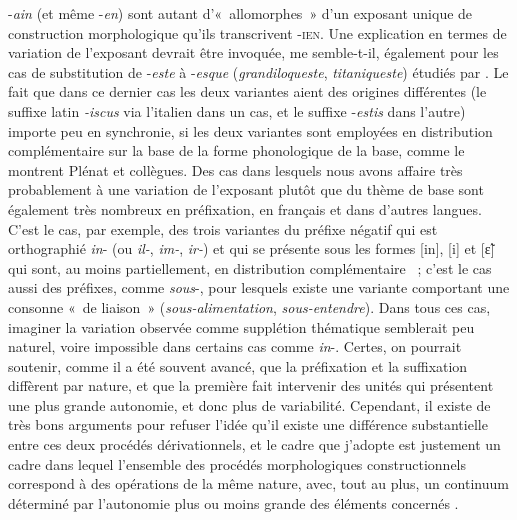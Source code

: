 \documentclass[output=paper]{langsci/langscibook}
\begin{document}
-\emph{ain} (et même -\emph{en}) sont autant d'«~allomorphes~» d'un
exposant unique de construction morphologique qu'ils transcrivent
-\textsc{ien}. Une explication en termes de variation de l'exposant
devrait être invoquée, me semble-t-il, également pour les cas de
substitution de -\emph{este} à -\emph{esque} (\emph{grandiloqueste},
\emph{titaniqueste}) étudiés par %
\citet{plenat2002.pichon}%
%
%
. Le fait
que dans ce dernier cas les deux variantes aient des origines
différentes (le suffixe latin \mbox{\emph{-iscus}} via l'italien dans un cas,
et le suffixe -\emph{estis} dans l'autre) importe peu en synchronie, si
les deux variantes sont employées en distribution complémentaire sur la
base de la forme phonologique de la base, comme le montrent Plénat et
collègues. Des cas dans lesquels nous avons affaire très probablement à
une variation de l'exposant plutôt que du thème de base sont également
très nombreux en préfixation, en français et dans d'autres langues.
C'est le cas, par exemple, des trois variantes du préfixe négatif qui
est orthographié \emph{in}- (ou \emph{il-}, \emph{im-}, \emph{ir-}) et
qui se présente sous les formes {[}in{]}, {[}i{]} et {[}ɛ̃{]} qui sont,
au moins partiellement, en distribution complémentaire %
\citep[cf.][]{Apotheloz2003}%
%
%
~; c'est le cas aussi des préfixes, comme \emph{sous}-, pour
lesquels existe une variante comportant une consonne «~de liaison~»
(\emph{sous-alimentation}, \emph{sous-entendre}). Dans tous ces cas,
imaginer la variation observée comme supplétion thématique semblerait
peu naturel, voire impossible dans certains cas comme \emph{in}-.
Certes, on pourrait soutenir, comme il a été souvent avancé, que la
préfixation et la suffixation diffèrent par nature, et que la première
fait intervenir des unités qui présentent une plus grande autonomie, et
donc plus de variabilité. Cependant, il existe de très bons arguments
pour refuser l'idée qu'il existe une différence substantielle entre ces
deux procédés dérivationnels, et le cadre que j'adopte est justement un
cadre dans lequel l'ensemble des procédés morphologiques
constructionnels correspond à des opérations de la même nature, avec,
tout au plus, un continuum déterminé par l'autonomie plus ou moins
grande des éléments concernés %
\citep[cf.][]{lasserre2014.cmlf}%
%
.
\end{document}
